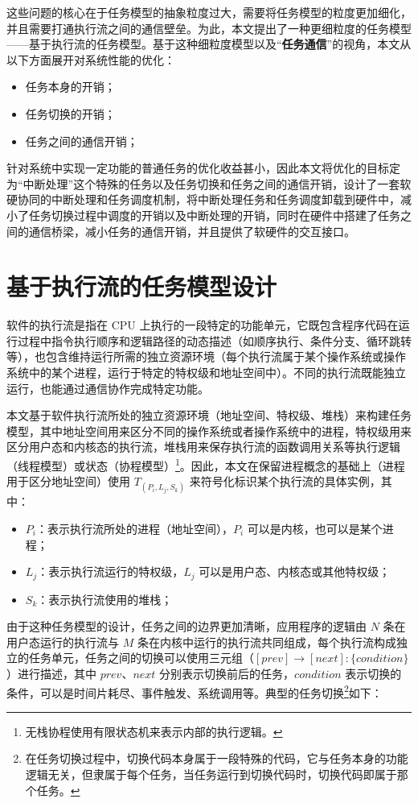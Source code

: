 这些问题的核心在于任务模型的抽象粒度过大，需要将任务模型的粒度更加细化，并且需要打通执行流之间的通信壁垒。为此，本文提出了一种更细粒度的任务模型——基于执行流的任务模型。基于这种细粒度模型以及“\textbf{任务通信}”的视角，本文从以下方面展开对系统性能的优化：
\begin{itemize}
    \item 任务本身的开销；
    \item 任务切换的开销；
    \item 任务之间的通信开销；
\end{itemize}

针对系统中实现一定功能的普通任务的优化收益甚小，因此本文将优化的目标定为“中断处理”这个特殊的任务以及任务切换和任务之间的通信开销，设计了一套软硬协同的中断处理和任务调度机制，将中断处理任务和任务调度卸载到硬件中，减小了任务切换过程中调度的开销以及中断处理的开销，同时在硬件中搭建了任务之间的通信桥梁，减小任务的通信开销，并且提供了软硬件的交互接口。

\section{基于执行流的任务模型设计}

软件的执行流是指在 CPU 上执行的一段特定的功能单元，它既包含程序代码在运行过程中指令执行顺序和逻辑路径的动态描述（如顺序执行、条件分支、循环跳转等），也包含维持运行所需的独立资源环境（每个执行流属于某个操作系统或操作系统中的某个进程，运行于特定的特权级和地址空间中）。不同的执行流既能独立运行，也能通过通信协作完成特定功能。

本文基于软件执行流所处的独立资源环境（地址空间、特权级、堆栈）来构建任务模型，其中地址空间用来区分不同的操作系统或者操作系统中的进程，特权级用来区分用户态和内核态的执行流，堆栈用来保存执行流的函数调用关系等执行逻辑（线程模型）或状态（协程模型）\footnote{无栈协程使用有限状态机来表示内部的执行逻辑。}。因此，本文在保留进程概念的基础上（进程用于区分地址空间）使用 $T_{(P_{i}, L_{j}, S_{k})}$ 来符号化标识某个执行流的具体实例，其中：

\begin{itemize}
    \item $P_{i}$：表示执行流所处的进程（地址空间），$P_{i}$ 可以是内核，也可以是某个进程；
    \item $L_{j}$：表示执行流运行的特权级，$L_{j}$ 可以是用户态、内核态或其他特权级；
    \item $S_{k}$：表示执行流使用的堆栈；
\end{itemize}

由于这种任务模型的设计，任务之间的边界更加清晰，应用程序的逻辑由 $N$ 条在用户态运行的执行流与 $M$ 条在内核中运行的执行流共同组成，每个执行流构成独立的任务单元，任务之间的切换可以使用三元组（$[prev]\longrightarrow [next] : \{condition\}$）进行描述，其中 $prev$、$next$ 分别表示切换前后的任务，$condition$ 表示切换的条件，可以是时间片耗尽、事件触发、系统调用等。典型的任务切换\footnote{在任务切换过程中，切换代码本身属于一段特殊的代码，它与任务本身的功能逻辑无关，但隶属于每个任务，当任务运行到切换代码时，切换代码即属于那个任务。}如下：

